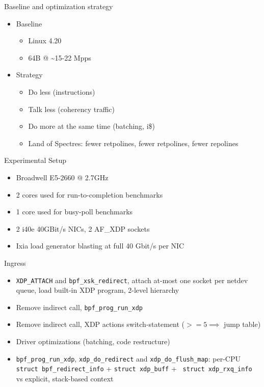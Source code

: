 \documentclass[aspectratio=169]{beamer}
\begin{document}
  \begin{frame}{Baseline and optimization strategy}
      \begin{itemize}
      \item Baseline
      \begin{itemize}
      \item Linux 4.20
      \item 64B @ \textasciitilde15-22 Mpps
      \end{itemize}

      \item Strategy
      \begin{itemize}
        \item Do less (instructions)
        \item Talk less (coherency traffic)
        \item Do more at the same time (batching, i\$)
        \item Land of Spectres: fewer retpolines, fewer retpolines,
          fewer repolines
      \end{itemize}
      \end{itemize}
  \end{frame}

  \begin{frame}{Experimental Setup}
  \begin{itemize}
  \item Broadwell E5-2660 @ 2.7GHz
  \item 2 cores used for run-to-completion benchmarks
  \item 1 core used for busy-poll benchmarks
  \item 2 i40e 40GBit/s NICs, 2 AF\_XDP sockets
  \item Ixia load generator blasting at full 40 Gbit/s per NIC
  \end{itemize}
  \end{frame}

  \begin{frame}{Ingress}
      \begin{itemize}
        \item {\tt XDP\_ATTACH} and {\tt bpf\_xsk\_redirect}, attach
          at-most one socket per netdev queue, load built-in XDP
          program, 2-level hierarchy
        \item Remove indirect call, {\tt bpf\_prog\_run\_xdp}
        \item Remove indirect call, XDP actions switch-statement ($>=5
          \implies$ jump table)
        \item Driver optimizations (batching, code restructure)
        \item {\tt bpf\_prog\_run\_xdp}, {\tt xdp\_do\_redirect} and
          {\tt xdp\_do\_flush\_map}: per-CPU {\tt struct
            bpf\_redirect\_info} + {\tt struct xdp\_buff} + {\tt
            struct xdp\_rxq\_info} vs explicit, stack-based context
      \end{itemize}
  \end{frame}
\end{document}
